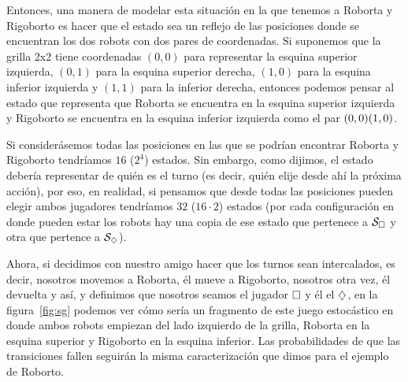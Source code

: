 Entonces, una manera de modelar esta situación en la que tenemos a Roborta y
Rigoborto es hacer que el estado sea un reflejo de las posiciones donde se
encuentran los dos robots con dos pares de coordenadas. Si suponemos que la
grilla 2x2 tiene coordenadas $(0,0)$ para representar la esquina superior
izquierda, $(0,1)$ para la esquina superior derecha, $(1,0)$ para la esquina
inferior izquierda y $(1,1)$ para la inferior derecha, entonces podemos pensar
al estado que representa que Roborta se encuentra en la esquina superior
izquierda y Rigoborto se encuentra en la esquina inferior izquierda como el par
$(0,0) \\ (1,0)$.

Si considerásemos todas las posiciones en las que se podrían encontrar Roborta
y Rigoborto tendríamos $16$ ($2^4$) estados. Sin embargo, como dijimos, el
estado debería representar de quién es el turno (es decir, quién elije desde
ahí la próxima acción), por eso, en realidad, si pensamos que desde todas las
posiciones pueden elegir ambos jugadores tendríamos $32$ ($16 \cdot 2$) estados
(por cada configuración en donde pueden estar los robots hay una copia de ese
estado que pertenece a $\mathcal{S}_\square$ y otra que pertence a $\mathcal{S}_\diamondsuit$).

Ahora, si decidimos con nuestro amigo hacer que los turnos sean intercalados,
es decir, nosotros movemos a Roborta, él mueve a Rigoborto, nosotros otra vez,
él devuelta y así, y definimos que nosotros seamos el jugador $\square$ y él el
$\diamondsuit$, en la figura~\ref{fig:sg} podemos ver cómo sería un fragmento de este
juego estocástico en donde ambos robots empiezan del lado izquierdo de la
grilla, Roborta en la esquina superior y Rigoborto en la esquina inferior. Las
probabilidades de que las transiciones fallen seguirán la misma caracterización
que dimos para el ejemplo de Roborto.

